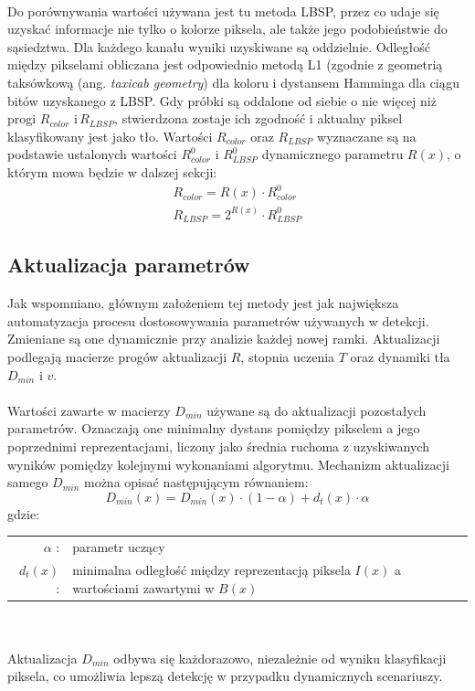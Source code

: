 \paragraph{}
Do porównywania wartości używana jest tu metoda LBSP, przez co udaje się uzyskać informacje nie tylko o kolorze piksela, ale także jego podobieństwie do sąsiedztwa. Dla każdego kanału wyniki uzyskiwane są oddzielnie. Odległość między pikselami obliczana jest odpowiednio metodą L1 (zgodnie z geometrią taksówkową (ang. \textit{taxicab geometry}) dla koloru i dystansem Hamminga dla ciągu bitów uzyskanego z LBSP. Gdy próbki są oddalone od siebie o nie więcej niż progi $R_{color}$ i\,$R_{LBSP}$, stwierdzona zostaje ich zgodność i aktualny piksel klasyfikowany jest jako tło. Wartości $R_{color}$ oraz $R_{LBSP}$ wyznaczane są na podstawie ustalonych wartości $R_{color}^{0}$ i $R_{LBSP}^{0}$ dynamicznego parametru $R(x)$, o którym mowa będzie w dalszej sekcji:
\begin{gather}
R_{color} = R(x)\cdot R_{color}^{0} \\
R_{LBSP} = 2^{R(x)}\cdot R_{LBSP}^{0}
\end{gather}
\subsection{Aktualizacja parametrów}
Jak wspomniano, głównym założeniem tej metody jest jak największa automatyzacja procesu dostosowywania parametrów używanych w detekcji. Zmieniane są one dynamicznie przy analizie każdej nowej ramki. Aktualizacji podlegają macierze progów aktualizacji $R$, stopnia uczenia $T$ oraz dynamiki tła $D_{min}$ i $v$.
\paragraph{}
Wartości zawarte w macierzy $D_{min}$ używane są do aktualizacji pozostałych parametrów. Oznaczają one minimalny dystans pomiędzy pikselem a jego poprzednimi reprezentacjami, liczony jako średnia ruchoma z uzyskiwanych wyników pomiędzy kolejnymi wykonaniami algorytmu. Mechanizm aktualizacji samego $D_{min}$ można opisać następującym równaniem:
\begin{equation}
D_{min}(x) = D_{min}(x)\cdot (1-\alpha)+d_{t}(x)\cdot \alpha
\end{equation}
gdzie:\\ 
\hspace*{3em}
\begin{tabular}{r p{}}
$\alpha$ : &  parametr uczący\\
$d_{t}(x)$ : & minimalna odległość między reprezentacją piksela $I(x)$ a wartościami zawartymi w $B(x)$
\end{tabular} 
~\\
~\\
Aktualizacja $D_{min}$ odbywa się każdorazowo, niezależnie od wyniku klasyfikacji piksela, co umożliwia lepszą detekcję w przypadku dynamicznych scenariuszy.
